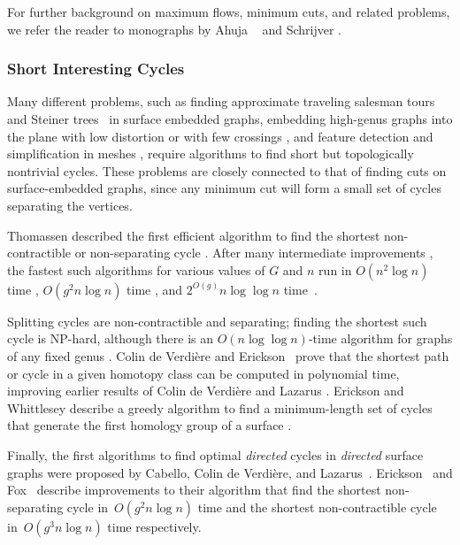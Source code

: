 \documentclass[11pt,twoside]{article}
\begin{document}
For further background on maximum flows, minimum cuts, and related problems, we refer the reader to monographs by Ahuja \etal\ \cite{amo-nftaa-93} and Schrijver \cite{s-cape-03}.

\subsubsection*{Short Interesting Cycles}

Many different problems, such as finding approximate traveling salesman tours  \cite{dhm-aacd-07} and Steiner trees~\cite{bdt-ptass-08} in surface embedded graphs, embedding high-genus graphs into the plane with low distortion \cite{is-pebgg-07} or with few crossings \cite{kr-ccnlt-07}, and feature detection and simplification in meshes \cite{gw-tnr-01,dlsc-cgaht-08}, require algorithms to find short but topologically nontrivial cycles.  These problems are closely connected to that of finding cuts on surface-embedded graphs, since any minimum cut will form a small set of cycles separating the vertices.

Thomassen described the first efficient algorithm to find the shortest non-contractible or non-separating cycle \cite{t-egnsn-90, mt-gs-01}.  After many intermediate improvements \cite{c-mdpg-06, cm-fsnsn-07, eh-ocsd-04, k-csnco-06,cc-msspg-07,insw-iamcmf-11}, the fastest such algorithms for various values of $G$ and $n$ run in $O(n^2\log n)$ time \cite{eh-ocsd-04}, $O(g^2n\log n)$ time \cite{cce-msspe-13}, and $2^{O(g)} n \log \log n$ time~\cite{f-sntcd-13}.

Splitting cycles are non-contractible and separating; finding the shortest such cycle is {NP}-hard, although there is an $O(n \log \log n)$-time algorithm for graphs of any fixed genus \cite{ccelw-scsih-06, ccelw-scsih-08,insw-iamcmf-11}.  Colin de Verdi\`ere and Erickson~\cite{ce-tspcs-06} prove that the shortest path or cycle in a given homotopy class can be computed in polynomial time, improving earlier results of Colin de Verdi\`ere and Lazarus \cite{c-rcds-03, cl-oslos-05, cl-opdsh-07}.  Erickson and Whittlesey describe a greedy algorithm to find a minimum-length set of cycles that generate the first homology group of a surface \cite{ew-gohhg-05}.

Finally, the first algorithms to find optimal \emph{directed} cycles in \emph{directed} surface graphs were proposed by Cabello, Colin de Verdi\`ere, and Lazarus~\cite{ccl-fsncd-10}.  Erickson~\cite{e-sncds-11} and Fox~\cite{f-sntcd-13} describe improvements to their algorithm that find the shortest non-separating cycle in~$O(g^2 n \log n)$ time and the shortest non-contractible cycle in~$O(g^3 n \log n)$ time respectively.
\end{document}
